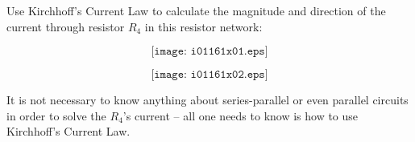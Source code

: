 

Use Kirchhoff's Current Law to calculate the magnitude and direction of the current through resistor $R_4$ in this resistor network:

$$\texttt{[image: i01161x01.eps]}$$







$$\texttt{[image: i01161x02.eps]}$$







It is not necessary to know anything about series-parallel or even parallel circuits in order to solve the $R_4$'s current -- all one needs to know is how to use Kirchhoff's Current Law.




